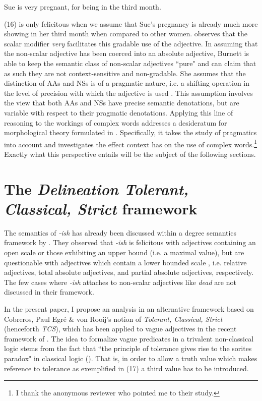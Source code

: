 \documentclass[output=paper
,modfonts
,nonflat]{langsci/langscibook}
\begin{document}
\ea
	Sue is very pregnant, for being in the third month.
\z

(16) is only felicitous when we assume that Sue's pregnancy is already much more showing in her third month when compared to other women. \textcite[44]{Burnett2017} observes that the scalar modifier \textit{very} facilitates this gradable use of the adjective. In assuming that the non-scalar adjective has been coerced into an absolute adjective, Burnett is able to keep the semantic class of non-scalar adjectives ``pure" and can claim that as such they are not context-sensitive and non-gradable. She assumes that the distinction of AAs and NSs is of a pragmatic nature, i.e. a shifting operation in the level of precision with which the adjective is used \citeyearpar[95]{Burnett2017}. This assumption involves the view that both AAs and NSs have precise semantic denotations, but are variable with respect to their pragmatic denotations. Applying this line of reasoning to the workings of complex words addresses a desideratum for morphological theory formulated in \textcite[226]{Plagetal}. Specifically, it takes the study of pragmatics into account and investigates the effect context has on the use of complex words.\footnote{I thank the anonymous reviewer who pointed me to their study.} Exactly what this perspective entails will be the subject of the following sections.

\section{The \textit{Delineation Tolerant, Classical, Strict} framework}
\label{sec:deltcs} %

The semantics of \textit{-ish} has already been discussed within a degree semantics framework by \citet*{Bochnak2014}. They observed that \textit{-ish} is felicitous with adjectives containing an open scale or those exhibiting an upper bound (i.e. a maximal value), but are questionable with adjectives which contain a lower bounded scale \citeyearpar[435--436]{Bochnak2014}, i.e. relative adjectives, total absolute adjectives, and partial absolute adjectives, respectively. The few cases where \textit{-ish} attaches to non-scalar adjectives like \textit{dead} are not discussed in their framework.

In the present paper, I propose an analysis in an alternative framework based on Cobreros, Paul Egré \& von Rooij's\citeyearpar{Cobreros2012} notion of \textit{Tolerant, Classical, Strict} (henceforth \textit{TCS}), which has been applied to vague adjectives in the recent framework of \citet{Burnett2017}. The idea to formalize vague predicates in a trivalent non-classical logic stems from the fact that ``the principle of tolerance gives rise to the sorites paradox" in classical logic (\textcite[348]{Cobreros2012}). That is, in order to allow a truth value which makes reference to tolerance as exemplified in (17) a third value has to be introduced. %
\end{document}
